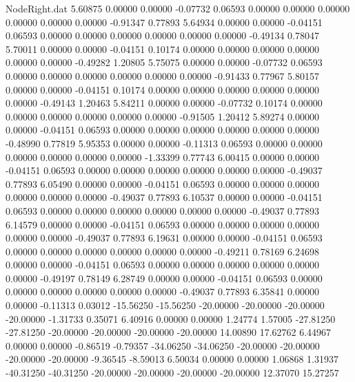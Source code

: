\begin{filecontents}{NodeRight.dat}
   5.60875    0.00000    0.00000    -0.07732    0.06593    0.00000    0.00000    0.00000    0.00000    0.00000    0.00000   -0.91347    0.77893
   5.64934    0.00000    0.00000    -0.04151    0.06593    0.00000    0.00000    0.00000    0.00000    0.00000    0.00000   -0.49134    0.78047
   5.70011    0.00000    0.00000    -0.04151    0.10174    0.00000    0.00000    0.00000    0.00000    0.00000    0.00000   -0.49282    1.20805
   5.75075    0.00000    0.00000    -0.07732    0.06593    0.00000    0.00000    0.00000    0.00000    0.00000    0.00000   -0.91433    0.77967
   5.80157    0.00000    0.00000    -0.04151    0.10174    0.00000    0.00000    0.00000    0.00000    0.00000    0.00000   -0.49143    1.20463
   5.84211    0.00000    0.00000    -0.07732    0.10174    0.00000    0.00000    0.00000    0.00000    0.00000    0.00000   -0.91505    1.20412
   5.89274    0.00000    0.00000    -0.04151    0.06593    0.00000    0.00000    0.00000    0.00000    0.00000    0.00000   -0.48990    0.77819
   5.95353    0.00000    0.00000    -0.11313    0.06593    0.00000    0.00000    0.00000    0.00000    0.00000    0.00000   -1.33399    0.77743
   6.00415    0.00000    0.00000    -0.04151    0.06593    0.00000    0.00000    0.00000    0.00000    0.00000    0.00000   -0.49037    0.77893
   6.05490    0.00000    0.00000    -0.04151    0.06593    0.00000    0.00000    0.00000    0.00000    0.00000    0.00000   -0.49037    0.77893
   6.10537    0.00000    0.00000    -0.04151    0.06593    0.00000    0.00000    0.00000    0.00000    0.00000    0.00000   -0.49037    0.77893
   6.14579    0.00000    0.00000    -0.04151    0.06593    0.00000    0.00000    0.00000    0.00000    0.00000    0.00000   -0.49037    0.77893
   6.19631    0.00000    0.00000    -0.04151    0.06593    0.00000    0.00000    0.00000    0.00000    0.00000    0.00000   -0.49211    0.78169
   6.24698    0.00000    0.00000    -0.04151    0.06593    0.00000    0.00000    0.00000    0.00000    0.00000    0.00000   -0.49197    0.78149
   6.28749    0.00000    0.00000    -0.04151    0.06593    0.00000    0.00000    0.00000    0.00000    0.00000    0.00000   -0.49037    0.77893
   6.35841    0.00000    0.00000    -0.11313    0.03012  -15.56250  -15.56250  -20.00000  -20.00000  -20.00000  -20.00000   -1.31733    0.35071
   6.40916    0.00000    0.00000     1.24774    1.57005  -27.81250  -27.81250  -20.00000  -20.00000  -20.00000  -20.00000   14.00890   17.62762
   6.44967    0.00000    0.00000    -0.86519   -0.79357  -34.06250  -34.06250  -20.00000  -20.00000  -20.00000  -20.00000   -9.36545   -8.59013
   6.50034    0.00000    0.00000     1.06868    1.31937  -40.31250  -40.31250  -20.00000  -20.00000  -20.00000  -20.00000   12.37070   15.27257

\end{filecontents}
